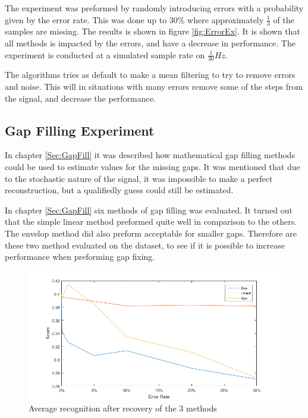 The experiment was preformed by randomly introducing errors with a probability given by the error rate. This was done up to 30\% where approximately $\frac{1}{3}$ of the samples are missing. The results is shown in figure \ref{fig:ErrorEx}. It is shown that all methods is impacted by the errors, and have a decrease in performance. The experiment is conducted at a simulated sample rate on $\frac{1}{30} Hz$.

The algorithms tries as default to make a mean filtering to try to remove errors and noise. This will in situations with many errors remove some of the steps from the signal, and decrease the performance.  



\subsection{Gap Filling Experiment}
In chapter \ref{Sec:GapFill} it was described how mathematical gap filling methods could be used to estimate values for the missing gaps. It was mentioned that due to the stochastic nature of the signal, it was impossible to make a perfect reconstruction, but a qualifiedly guess could still be estimated.

In chapter \ref{Sec:GapFill} six methods of gap filling was evaluated. It turned out that the simple linear method preformed quite well in comparison to the others. The envelop method did also preform acceptable for smaller gaps. Therefore are these two method evaluated on the  dataset, to see if it is possible to increase performance when preforming gap fixing. 


\begin{figure}[H]
\centering
\includegraphics[width=1\textwidth]{billeder/EcoRecError.png}
\caption{Average recognition after recovery of the 3 methods}
\label{fig:GER}
\end{figure}


